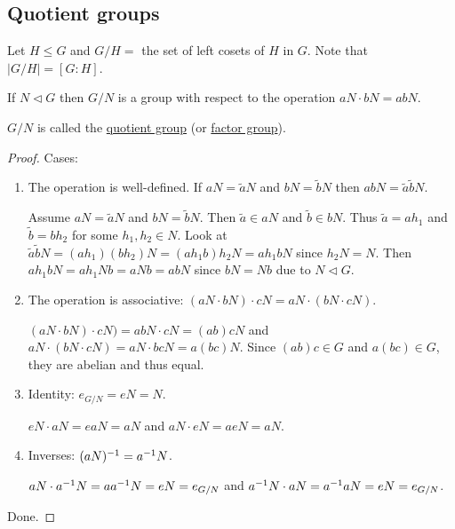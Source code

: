 \documentclass[]{article}
\begin{document}
\subsection{Quotient groups}

Let $H\leq G$ and $G / H =$ the set of left cosets of $H$ in $G$. Note that $|G/H|=[G:H]$.

\begin{theorem}
	If $N\triangleleft G$ then $G/N$ is a group with respect to the operation $aN\cdot bN = abN$.
\end{theorem}
\begin{definition}
	$G/N$ is called the \ul{quotient group} (or \ul{factor group}).
\end{definition}
\begin{proof}
	Cases:
	\begin{enumerate}
		\item The operation is well-defined. If $aN = \tilde aN$ and $bN = \tilde bN$ then $abN = \tilde a\tilde bN$.

			Assume $aN = \tilde aN$ and $bN = \tilde bN$. Then $\tilde a\in aN$ and $\tilde b\in bN$. Thus $\tilde a = ah_1$ and $\tilde b = bh_2$ for some $h_1,h_2\in N$.
			Look at $\tilde a\tilde bN = (ah_1)(bh_2)N = (ah_1 b)h_2 N = ah_1bN$ since $h_2N = N$. Then $ah_1bN = ah_1Nb = aNb = abN$ since $bN = Nb$ due to $N\triangleleft G$.

		\item The operation is associative: $(aN\cdot bN)\cdot cN = aN\cdot(bN\cdot cN)$.

			$(aN\cdot bN)\cdot cN) = abN\cdot cN = (ab)cN$ and $aN\cdot(bN\cdot cN) = aN\cdot bcN = a(bc)N$. Since $(ab)c\in G$ and $a(bc)\in G$, they are abelian and thus equal.

		\item Identity: $e_{G/N} = eN = N$.

			$eN\cdot aN = eaN = aN$ and $aN\cdot eN = aeN = aN$.

		\item Inverses: $(aN)^{-1} = a^{-1} N$.

			$aN\cdot a^{-1} N = aa^{-1} N = eN = e_{G/N}$ and $a^{-1} N\cdot aN = a^{-1} aN = eN = e_{G/N}$.
	\end{enumerate}
	Done.
\end{proof}
\end{document}
